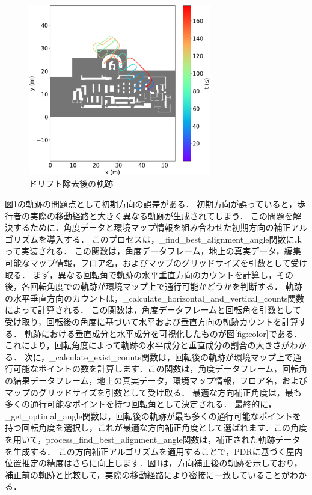 \documentclass[Japanese]{dicomopapers}
\begin{document}
\begin{figure}[h]
	\centering
	\includegraphics[width=80mm]{image/pdr-remove-drift.jpg}
	\caption{ドリフト除去後の軌跡} \label{fig:pdr-remove-drift}
\end{figure}


図\ref{fig:pdr-remove-drift}の軌跡の問題点として初期方向の誤差がある．
初期方向が誤っていると，歩行者の実際の移動経路と大きく異なる軌跡が生成されてしまう．
この問題を解決するために．角度データと環境マップ情報を組み合わせた初期方向の補正アルゴリズムを導入する．
このプロセスは，\_find\_best\_alignment\_angle関数によって実装される．
この関数は，角度データフレーム，地上の真実データ，編集可能なマップ情報，フロア名，およびマップのグリッドサイズを引数として受け取る．
まず，異なる回転角で軌跡の水平垂直方向のカウントを計算し，その後，各回転角度での軌跡が環境マップ上で通行可能かどうかを判断する．
軌跡の水平垂直方向のカウントは，\_calculate\_horizontal\_and\_vertical\_counts関数によって計算される．
この関数は，角度データフレームと回転角を引数として受け取り，回転後の角度に基づいて水平および垂直方向の軌跡カウントを計算する．
軌跡における垂直成分と水平成分を可視化したものが図\ref{fig:color}である．
これにより，回転角度によって軌跡の水平成分と垂直成分の割合の大きさがわかる．
次に，\_calculate\_exist\_counts関数は，回転後の軌跡が環境マップ上で通行可能なポイントの数を計算します．この関数は，角度データフレーム，回転角の結果データフレーム，地上の真実データ，環境マップ情報，フロア名，およびマップのグリッドサイズを引数として受け取る．
最適な方向補正角度は，最も多くの通行可能なポイントを持つ回転角として決定される．
最終的に，\_get\_optimal\_angle関数は，回転後の軌跡が最も多くの通行可能なポイントを持つ回転角度を選択し，これが最適な方向補正角度として選ばれます．この角度を用いて，process\_find\_best\_alignment\_angle関数は，補正された軌跡データを生成する．
この方向補正アルゴリズムを適用することで，PDRに基づく屋内位置推定の精度はさらに向上します．図\ref{fig:pdr-remove-drift}は，方向補正後の軌跡を示しており，補正前の軌跡と比較して，実際の移動経路により密接に一致していることがわかる．
\end{document}
